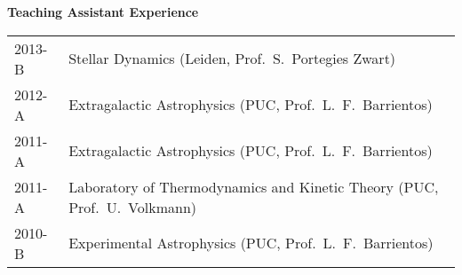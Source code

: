 \documentclass[11pt]{article}
\begin{document}
% 
% 


\pagebreak

\noindent
{\bf\Large Teaching Assistant Experience}\\
\vspace{-0.2cm}

\begin{table}[h!]
\begin{tabular}{l l}
2013-B & Stellar Dynamics (Leiden, Prof.~S.~Portegies Zwart)\\
2012-A & Extragalactic Astrophysics (PUC, Prof.~L.~F.~Barrientos)\\
2011-A & Extragalactic Astrophysics (PUC, Prof.~L.~F.~Barrientos)\\
2011-A & Laboratory of Thermodynamics and Kinetic Theory (PUC, Prof.~U.~Volkmann)\\
2010-B & Experimental Astrophysics (PUC, Prof.~L.~F.~Barrientos)
\end{tabular}
\end{table}
\end{document}
